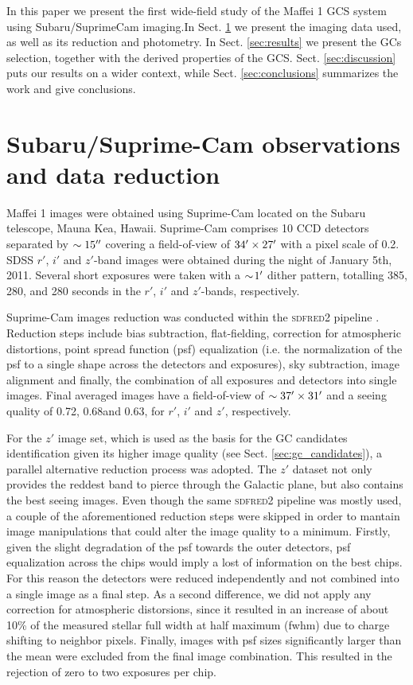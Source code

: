 \documentclass[useAMS,usenatbib]{mn2e}
\begin{document}
In this paper we present the first wide-field study of the Maffei 1
GCS system using Subaru/SuprimeCam imaging.In Sect. \ref{sec:obs} we
present the imaging data used, as well as its reduction and
photometry. In Sect. \ref{sec:results} we present the GCs selection,
together with the derived properties of the
GCS. Sect. \ref{sec:discussion} puts our results on a wider context,
while Sect. \ref{sec:conclusions} summarizes the work and give
conclusions.

\section{Subaru/Suprime-Cam observations and data reduction}
\label{sec:obs}

Maffei 1 images were obtained using Suprime-Cam \citep{miyazaki02}
located on the Subaru telescope, Mauna Kea, Hawaii. Suprime-Cam
comprises 10 CCD detectors separated by $\sim15\hbox{$^{\prime\prime}$}$ covering a
field-of-view of $34\hbox{$^\prime$}\times27\hbox{$^\prime$}$ with a pixel scale of
0.2\arcsec. SDSS $r'$, $i'$ and $z'$-band images were obtained during
the night of January 5th, 2011.  Several short exposures were taken
with a $\sim\!  1\hbox{$^\prime$}$ dither pattern, totalling 385, 280, and 280
seconds in the $r'$, $i'$ and $z'$-bands, respectively.

Suprime-Cam images reduction was conducted within the \textsc{sdfred2}
pipeline \citep{ouchi04}. Reduction steps include bias subtraction,
flat-fielding, correction for atmospheric distortions, point spread
function (psf) equalization (i.e. the normalization of the psf to a
single shape across the detectors and exposures), sky subtraction,
image alignment and finally, the combination of all exposures and
detectors into single images. Final averaged images have a
field-of-view of $\sim37\hbox{$^\prime$}\times 31\hbox{$^\prime$}$ and a seeing quality
of 0.72\arcsec, 0.68\arcsec and 0.63\arcsec, for $r'$, $i'$ and $z'$,
respectively.

For the $z'$ image set, which is used as the basis for the GC
candidates identification given its higher image quality (see
Sect. \ref{sec:gc_candidates}), a parallel alternative reduction
process was adopted. The $z'$ dataset not only provides the reddest
band to pierce through the Galactic plane, but also contains the best
seeing images. Even though the same \textsc{sdfred2} pipeline was
mostly used, a couple of the aforementioned reduction steps were
skipped in order to mantain image manipulations that could alter the
image quality to a minimum. Firstly, given the slight degradation of
the psf towards the outer detectors, psf equalization across the chips
would imply a lost of information on the best chips. For this reason
the detectors were reduced independently and not combined into a
single image as a final step. As a second difference, we did not apply
any correction for atmospheric distorsions, since it resulted in an
increase of about 10\% of the measured stellar full width at half
maximum (fwhm) due to charge shifting to neighbor pixels. Finally,
images with psf sizes significantly larger than the mean were excluded
from the final image combination. This resulted in the rejection of
zero to two exposures per chip.
\end{document}
